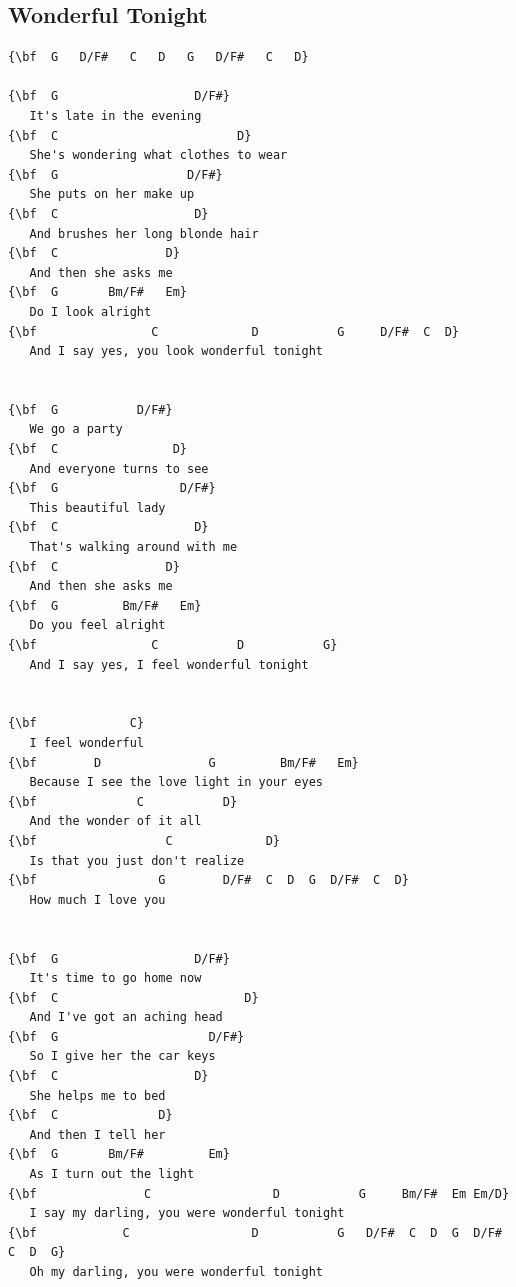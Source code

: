 \documentclass[a4paper]{article}
\begin{document}
\subsection{Wonderful Tonight}
\begin{Verbatim}[commandchars=\\\{\}]
{\bf  G   D/F#   C   D   G   D/F#   C   D}

{\bf  G                   D/F#}
   It's late in the evening
{\bf  C                         D}
   She's wondering what clothes to wear
{\bf  G                  D/F#}
   She puts on her make up
{\bf  C                   D}
   And brushes her long blonde hair
{\bf  C               D}
   And then she asks me
{\bf  G       Bm/F#   Em}
   Do I look alright
{\bf                C             D           G     D/F#  C  D}
   And I say yes, you look wonderful tonight


{\bf  G           D/F#}
   We go a party
{\bf  C                D}
   And everyone turns to see
{\bf  G                 D/F#}
   This beautiful lady
{\bf  C                   D}
   That's walking around with me
{\bf  C               D}
   And then she asks me
{\bf  G         Bm/F#   Em}
   Do you feel alright
{\bf                C           D           G}
   And I say yes, I feel wonderful tonight


{\bf             C}
   I feel wonderful
{\bf        D               G         Bm/F#   Em}
   Because I see the love light in your eyes
{\bf              C           D}
   And the wonder of it all
{\bf                  C             D}
   Is that you just don't realize
{\bf                 G        D/F#  C  D  G  D/F#  C  D}
   How much I love you


{\bf  G                   D/F#}
   It's time to go home now
{\bf  C                          D}
   And I've got an aching head
{\bf  G                     D/F#}
   So I give her the car keys
{\bf  C                   D}
   She helps me to bed
{\bf  C              D}
   And then I tell her
{\bf  G       Bm/F#         Em}
   As I turn out the light
{\bf               C                 D           G     Bm/F#  Em Em/D}
   I say my darling, you were wonderful tonight
{\bf            C                 D           G   D/F#  C  D  G  D/F#  C  D  G}
   Oh my darling, you were wonderful tonight

\end{Verbatim}
\newpage
\end{document}
